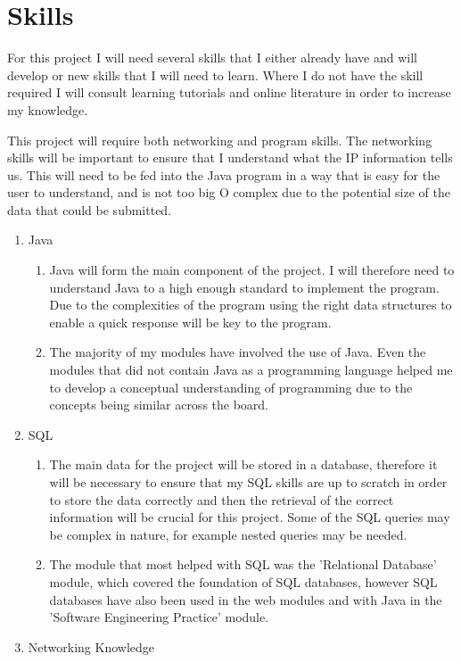 \section{Skills}
For this project I will need several skills that I either already have and will develop or new skills that I will need to learn. Where I do not have the skill required I will consult learning tutorials and online literature in order to increase my knowledge. 

This project will require both networking and program skills. The networking skills will be important to ensure that I understand what the IP information tells us. This will need to be fed into the Java program in a way that is easy for the user to understand, and is not too big O complex due to the potential size of the data that could be submitted. 
\begin{enumerate}
\item Java 
\begin{enumerate}
    \item Java will form the main component of the project. I will therefore need to understand Java to a high enough standard to implement the program. Due to the complexities of the program using the right data structures to enable a quick response will be key to the program. 
    \item The majority of my modules have involved the use of Java. Even the modules that did not contain Java as a programming language helped me to develop a conceptual understanding of programming due to the concepts being similar across the board.
\end{enumerate}
\item SQL
\begin{enumerate}
    \item The main data for the project will be stored in a database, therefore it will be necessary to ensure that my SQL skills are up to scratch in order to store the data correctly and then the retrieval of the correct information will be crucial for this project. Some of the SQL queries may be complex in nature, for example nested queries may be needed.
    \item The module that most helped with SQL was the 'Relational Database' module, which covered the foundation of SQL databases, however SQL databases have also been used in the web modules and with Java in the 'Software Engineering Practice' module. \end{enumerate}
\item Networking Knowledge
\begin{enumerate}

\end{enumerate}
\end{enumerate}
